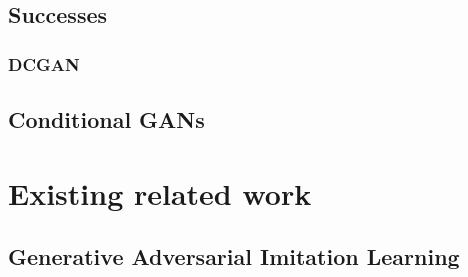 \subsection{Successes}
\subsubsection{DCGAN}
\subsection{Conditional GANs}


\section{Existing related work}
\subsection{Generative Adversarial Imitation Learning}

